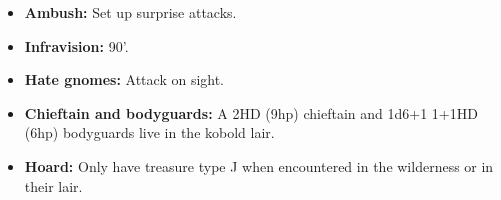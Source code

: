 \documentclass[letterpaper,sansserif,tightsqueeze]{rpg-module}
\begin{document}
\begin{itemize}
	\item \textbf{Ambush:} Set up surprise attacks.
	\item \textbf{Infravision:} 90'.
	\item \textbf{Hate gnomes:} Attack on sight.
	\item \textbf{Chieftain and bodyguards:} A 2HD (9hp) chieftain and 1d6+1 1+1HD (6hp) bodyguards live in the kobold lair.
	\item \textbf{Hoard:} Only have treasure type J when encountered in the wilderness or in their lair.
\end{itemize}

% 
% 
\end{document}
